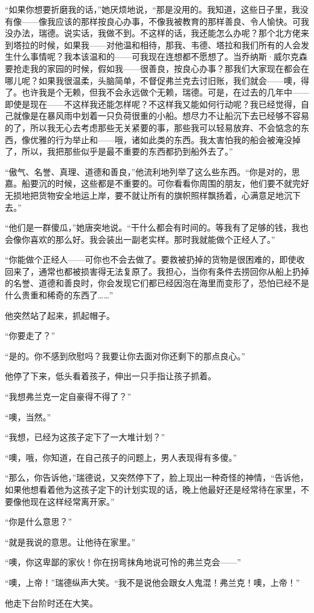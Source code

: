 \par “如果你想要折磨我的话，”她厌烦地说，“那是没用的。我知道，这些日子里，我没有像——像我应该的那样按良心办事，不像我被教育的那样善良、令人愉快。可我没办法，瑞德。说实话，我做不到。不这样的话，我还能怎么办呢？那个北方佬来到塔拉的时候，如果我——对他温和相待，那我、韦德、塔拉和我们所有的人会发生什么事情呢？我本该温和的——可我现在连想都不愿想了。当乔纳斯·威尔克森要抢走我的家园的时候，假如我——很善良，按良心办事？那我们大家现在都会在哪儿呢？如果我很温柔，头脑简单，不督促弗兰克去讨旧账，我们就会——噢，得了。也许我是个无赖，但我不会永远做个无赖，瑞德。可是，在过去的几年中——即使是现在——不这样我还能怎样呢？不这样我又能如何行动呢？我已经觉得，自己就像是在暴风雨中划着一只负荷很重的小船。想尽力不让船沉下去已经够不容易的了，所以我无心去考虑那些无关紧要的事，那些我可以轻易放弃、不会惦念的东西，像优雅的行为举止和——哦，诸如此类的东西。我太害怕我的船会被淹没掉了，所以，我把那些似乎是最不重要的东西都扔到船外去了。”
\par “傲气、名誉、真理、道德和善良，”他流利地列举了这么些东西。“你是对的，思嘉。船要沉的时候，这些都是不重要的。可你看看你周围的朋友，他们要不就完好无损地把货物安全地运上岸，要不就让所有的旗帜照样飘扬着，心满意足地沉下去。”
\par “他们是一群傻瓜，”她唐突地说。“干什么都会有时间的。等我有了足够的钱，我也会像你喜欢的那么好。我会装出一副老实样。那时我就能做个正经人了。”
\par “你能做个正经人——可你也不会去做了。要救被扔掉的货物是很困难的，即使收回来了，通常也都被损害得无法复原了。我担心，当你有条件去捞回你从船上扔掉的名誉、道德和善良时，你会发现它们都已经因泡在海里而变形了，恐怕已经不是什么贵重和稀奇的东西了……”
\par 他突然站了起来，抓起帽子。
\par “你要走了？”
\par “是的。你不感到欣慰吗？我要让你去面对你还剩下的那点良心。”
\par 他停了下来，低头看着孩子，伸出一只手指让孩子抓着。
\par “我想弗兰克一定自豪得不得了？”
\par “噢，当然。”
\par “我想，已经为这孩子定下了一大堆计划？”
\par “噢，哦，你知道，在自己孩子的问题上，男人表现得有多傻。”
\par “那么，你告诉他，”瑞德说，又突然停下了，脸上现出一种奇怪的神情，“告诉他，如果他想看着他为这孩子定下的计划实现的话，晚上他最好还是经常待在家里，不要像他现在这样经常离开家。”
\par “你是什么意思？”
\par “就是我说的意思。让他待在家里。”
\par “噢，你这卑鄙的家伙！你在拐弯抹角地说可怜的弗兰克会——”
\par “噢，上帝！”瑞德纵声大笑。“我不是说他会跟女人鬼混！弗兰克！噢，上帝！”
\par 他走下台阶时还在大笑。

